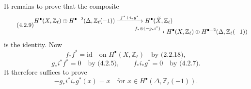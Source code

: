 It remains to prove that the composite
\begin{equation}\tag{4.2.9}
\begin{aligned}
&H^\bullet(X,\mathbb Z_\ell)\oplus
 H^{\bullet-2}(\Delta,\mathbb Z_\ell(-1))
 \xrightarrow{\ f^*+i_*g^*\ }
 H^\bullet(\widetilde X,\mathbb Z_\ell)\\[-2pt]
&\hspace{55mm}\xrightarrow{\ f_*\oplus(-g_*i^*)\ }
 H^\bullet(X,\mathbb Z_\ell)\oplus
 H^{\bullet-2}(\Delta,\mathbb Z_\ell(-1))
\end{aligned}
\end{equation}
is the identity.  Now
\[
f_*f^*=\mathrm{id}\quad\text{on }H^\bullet(X,\mathbb Z_\ell)
\quad\text{by (2.2.18)},
\]
\[
g_*i^*f^*=0\quad\text{by (4.2.5)},
\qquad
f_*i_*g^*=0\quad\text{by (4.2.7)}.
\]
It therefore suffices to prove
\begin{equation}\tag{4.2.10}
-g_*i^*i_*g^*(x)=x
\quad\text{for }x\in H^\bullet(\Delta,\mathbb Z_\ell(-1)).
\end{equation}

